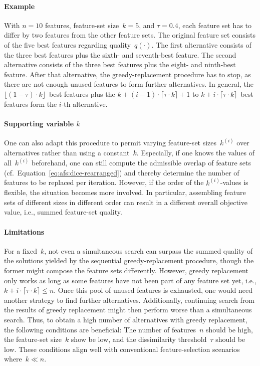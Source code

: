 \documentclass{article}
\theoremstyle{definition}
\begin{document}
\paragraph{Example}

With $n=10$ features, feature-set size~$k=5$, and $\tau=0.4$, each feature set has to differ by two features from the other feature sets.
The original feature set consists of the five best features regarding quality~$q(\cdot)$.
The first alternative consists of the three best features plus the sixth- and seventh-best feature.
The second alternative consists of the three best features plus the eight- and ninth-best feature.
After that alternative, the greedy-replacement procedure has to stop, as there are not enough unused features to form further alternatives.
In general, the $\lfloor (1 - \tau) \cdot k \rfloor$~best features plus the $k + (i-1) \cdot \lceil \tau \cdot k \rceil + 1$ to $k + i \cdot \lceil \tau \cdot k \rceil$~best features form the $i$-th alternative.

\paragraph{Supporting variable $k$}

One can also adapt this procedure to permit varying feature-set sizes~$k^{(i)}$ over alternatives rather than using a constant~$k$.
Especially, if one knows the values of all~$k^{(i)}$ beforehand, one can still compute the admissible overlap of feature sets (cf.~Equation~\ref{eq:afs:dice-rearranged}) and thereby determine the number of features to be replaced per iteration.
However, if the order of the $k^{(i)}$-values is flexible, the situation becomes more involved.
In particular, assembling feature sets of different sizes in different order can result in a different overall objective value, i.e., summed feature-set quality.

\paragraph{Limitations}

For a fixed~$k$, not even a simultaneous search can surpass the summed quality of the solutions yielded by the sequential greedy-replacement procedure, though the former might compose the feature sets differently.
However, greedy replacement only works as long as some features have not been part of any feature set yet, i.e., $k + i \cdot \lceil \tau \cdot k \rceil \leq n$.
Once this pool of unused features is exhausted, one would need another strategy to find further alternatives.
Additionally, continuing search from the results of greedy replacement might then perform worse than a simultaneous search.
Thus, to obtain a high number of alternatives with greedy replacement, the following conditions are beneficial:
The number of features~$n$ should be high, the feature-set size~$k$ show be low, and the dissimilarity threshold~$\tau$ should be low.
These conditions align well with conventional feature-selection scenarios where~$k \ll n$.
\end{document}
